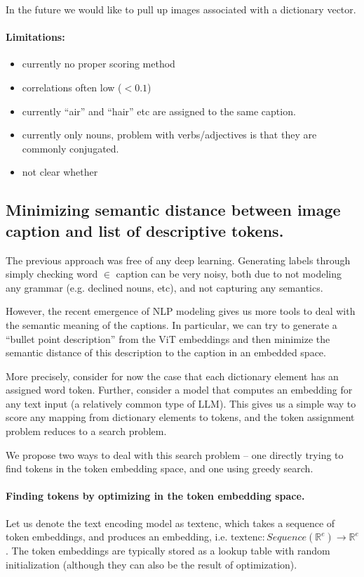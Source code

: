 \documentclass[11pt]{article}
\begin{document}
In the future we would like to pull up images associated with a dictionary vector.
\paragraph{Limitations:}
\label{sec:orged22755}
\begin{itemize}
\item currently no proper scoring method
\item correlations often low (\(< 0.1\))
\item currently ``air'' and ``hair'' etc are assigned to the same caption.
\item currently only nouns, problem with verbs/adjectives is that they are commonly conjugated.
\item not clear whether
\end{itemize}
\subsection{Minimizing semantic distance between image caption and list of descriptive tokens.}
\label{sec:orgdbb886c}
The previous approach was free of any deep learning.
Generating labels through simply checking word \(\in\) caption can be very noisy, both due to not modeling any grammar (e.g. declined nouns, etc), and not capturing any semantics.

However, the recent emergence of NLP modeling gives us more tools to deal with the semantic meaning of the captions.
In particular, we can try to generate a ``bullet point description'' from the ViT embeddings and then minimize the semantic distance of this description to the caption in an embedded space.

More precisely, consider for now the case that each dictionary element has an assigned word token.
Further, consider a model that computes an embedding for any text input (a relatively common type of LLM).
This gives us a simple way to score any mapping from dictionary elements to tokens, and the token assignment problem reduces to a search problem.

We propose two ways to deal with this search problem -- one directly trying to find tokens in the token embedding space, and one using greedy search.
\paragraph{Finding tokens by optimizing in the token embedding space.}
\label{sec:org216e178}
Let us denote the text encoding model as \(\mathrm{textenc}\), which takes a sequence of token embeddings, and produces an embedding, i.e. \(\mathrm{textenc}: {Sequence}(\mathbb{R}^e) \rightarrow \mathbb{R}^e\).
The token embeddings are typically stored as a lookup table with random initialization (although they can also be the result of optimization).
\end{document}
